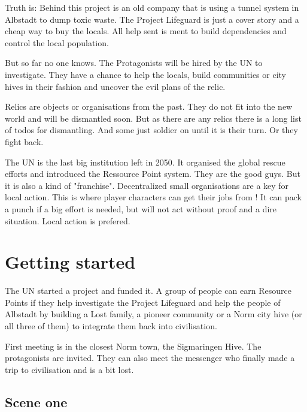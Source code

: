 Truth is: Behind this project is an old company that is using a tunnel system in Albstadt to dump toxic waste. The Project Lifeguard is just a  cover story and a cheap way to buy the locals. All help sent is ment to build dependencies and control the local population.

But so far no one knows. The Protagonists will be hired by the UN to investigate. They have a chance to help the locals, build communities or city hives in their fashion and uncover the evil plans of the relic.

\begin{sidebarBox}[title=Relics]
Relics are objects or organisations from the past. They do not fit into the new world and will be dismantled soon. But as there are any relics there is a long list of todos for dismantling. And some just soldier on until it is their turn. Or they fight back.
\end{sidebarBox}

\begin{sidebarBox}[title=UN]
The UN is the last big institution left in 2050. It organised the global rescue efforts and introduced the Ressource Point system. They are the good guys.
But it is also a kind of "franchise". Decentralized small organisations are a key for local action. This is where player characters can get their jobs from !
It can pack a punch if a big effort is needed, but will not act without proof and a dire situation.
Local action is prefered.
\end{sidebarBox}

\section{Getting started}

The UN started a project and funded it. A group of people can earn Resource Points if they help investigate the Project Lifeguard and help the people of Albstadt by building a Lost family, a pioneer community or a Norm city hive (or all three of them) to integrate them back into civilisation.

First meeting is in the closest Norm town, the Sigmaringen Hive. The protagonists are invited. They can also meet the messenger who finally made a trip to civilisation and is a bit lost.

\subsection{Scene one}

